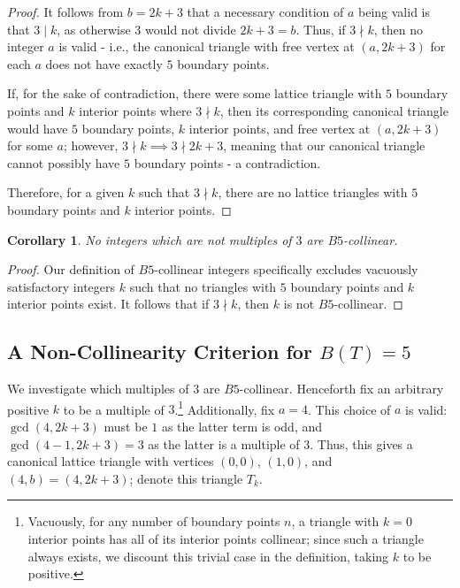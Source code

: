 \documentclass{article}
\theoremstyle{mydefstyle}
\newtheorem{corollary}[theorem]{Corollary}
\begin{document}
\begin{proof}
It follows from $b=2k+3$ that a necessary condition of $a$ being valid is that $3\mid k$, as otherwise $3$ would not divide $2k+3=b$. Thus, if $3\nmid k$, then no integer $a$ is valid - i.e., the canonical triangle with free vertex at $(a,2k+3)$ for each $a$ does not have exactly $5$ boundary points. 

If, for the sake of contradiction, there were some lattice triangle with $5$ boundary points and $k$ interior points where $3\nmid k$, then its corresponding canonical triangle would have $5$ boundary points, $k$ interior points, and free vertex at $(a,2k+3)$ for some $a$; however, $3\nmid k\implies3\nmid2k+3$, meaning that our canonical triangle cannot possibly have $5$ boundary points - a contradiction. 

Therefore, for a given $k$ such that $3\nmid k$, there are no lattice triangles with $5$ boundary points and $k$ interior points. 

\end{proof}

\begin{corollary}
No integers which are not multiples of $3$ are $B5$-collinear. 
\end{corollary}

\begin{proof}
Our definition of $B5$-collinear integers specifically excludes vacuously satisfactory integers $k$ such that no triangles with $5$ boundary points and $k$ interior points exist. It follows that if $3\nmid k$, then $k$ is not $B5$-collinear. 
\end{proof}

\subsection{A Non-Collinearity Criterion for $B(T)=5$}

We investigate which multiples of $3$ are $B5$-collinear. Henceforth fix an arbitrary positive $k$ to be a multiple of $3$.\footnote{Vacuously, for any number of boundary points $n$, a triangle with $k=0$ interior points has all of its interior points collinear; since such a triangle always exists, we discount this trivial case in the definition, taking $k$ to be positive.} Additionally, fix $a=4$. This choice of $a$ is valid: $\gcd(4,2k+3)$ must be $1$ as the latter term is odd, and $\gcd(4-1,2k+3)=3$ as the latter is a multiple of $3$. Thus, this gives a canonical lattice triangle with vertices $(0,0)$, $(1,0)$, and $(4,b)=(4,2k+3)$; denote this triangle $T_k$. 
\end{document}
